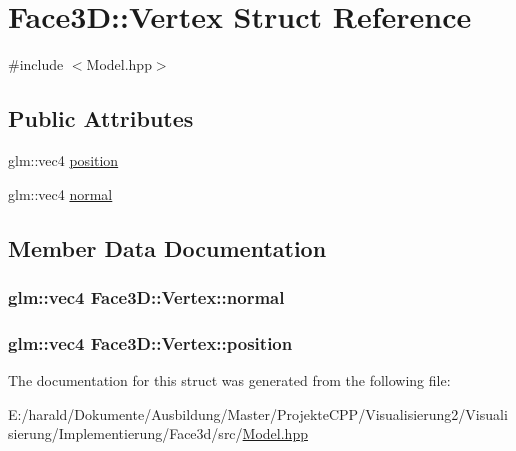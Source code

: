 \hypertarget{struct_face3_d_1_1_vertex}{}\section{Face3D\+:\+:Vertex Struct Reference}
\label{struct_face3_d_1_1_vertex}


{\ttfamily \#include $<$Model.\+hpp$>$}

\subsection*{Public Attributes}
\begin{DoxyCompactItemize}
\item 
glm\+::vec4 \hyperlink{struct_face3_d_1_1_vertex_a79ac5e4dc9a0fd62c167ffdaac9516b1}{position}
\item 
glm\+::vec4 \hyperlink{struct_face3_d_1_1_vertex_ad1020723e88d1adeaaaa74569614ca64}{normal}
\end{DoxyCompactItemize}


\subsection{Member Data Documentation}
\subsubsection[{\texorpdfstring{normal}{normal}}]{\setlength{\rightskip}{0pt plus 5cm}glm\+::vec4 Face3\+D\+::\+Vertex\+::normal}\hypertarget{struct_face3_d_1_1_vertex_ad1020723e88d1adeaaaa74569614ca64}{}\label{struct_face3_d_1_1_vertex_ad1020723e88d1adeaaaa74569614ca64}
\subsubsection[{\texorpdfstring{position}{position}}]{\setlength{\rightskip}{0pt plus 5cm}glm\+::vec4 Face3\+D\+::\+Vertex\+::position}\hypertarget{struct_face3_d_1_1_vertex_a79ac5e4dc9a0fd62c167ffdaac9516b1}{}\label{struct_face3_d_1_1_vertex_a79ac5e4dc9a0fd62c167ffdaac9516b1}


The documentation for this struct was generated from the following file\+:\begin{DoxyCompactItemize}
\item 
E\+:/harald/\+Dokumente/\+Ausbildung/\+Master/\+Projekte\+C\+P\+P/\+Visualisierung2/\+Visualisierung/\+Implementierung/\+Face3d/src/\hyperlink{_model_8hpp}{Model.\+hpp}\end{DoxyCompactItemize}
